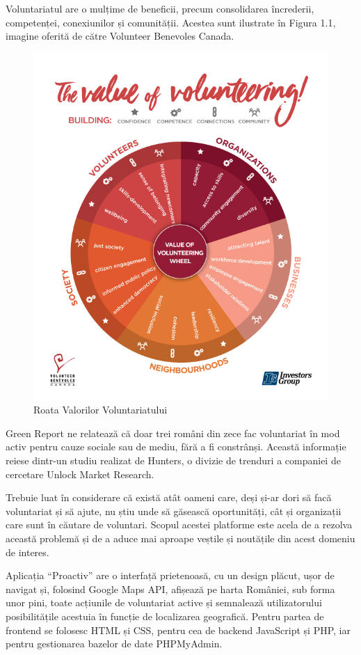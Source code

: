 \documentclass[12pt,a4paper]{report}
\begin{document}
\newpage
Voluntariatul are o mulțime de beneficii, precum consolidarea încrederii, competenței, conexiunilor și comunității. Acestea sunt ilustrate în Figura 1.1, imagine oferită de către Volunteer Benevoles Canada\cite{VBC}.
\begin{figure}[H]
\centering
  \includegraphics[width=0.7\linewidth]{VC_ValueOfVolunteering.jpg}
  \caption{Roata Valorilor Voluntariatului}
\end{figure}

\par
Green Report\cite{greenr} ne relatează că doar trei români din zece fac voluntariat în mod activ pentru cauze sociale sau de mediu, fără a fi constrânși. Această informație reiese dintr-un studiu realizat de Hunters, o divizie de trenduri a companiei de cercetare Unlock Market Research.
\\ \par
Trebuie luat în considerare că există atât oameni care, deși și-ar dori să facă voluntariat și să ajute, nu știu unde să găsească oportunități, cât și organizații care sunt în căutare de voluntari. Scopul acestei platforme este acela de a rezolva această problemă și de a aduce mai aproape veștile și noutățile din acest domeniu de interes.
\\ \par
Aplicația “Proactiv” are o interfață prietenoasă, cu un design plăcut, ușor de navigat și, folosind Google Maps API, afișează pe harta României, sub forma unor pini, toate acțiunile de voluntariat active și semnalează utilizatorului posibilitățile acestuia în funcție de localizarea geografică. Pentru partea de frontend se folosesc HTML și CSS, pentru cea de backend JavaScript și PHP, iar pentru gestionarea bazelor de date PHPMyAdmin.
\end{document}
